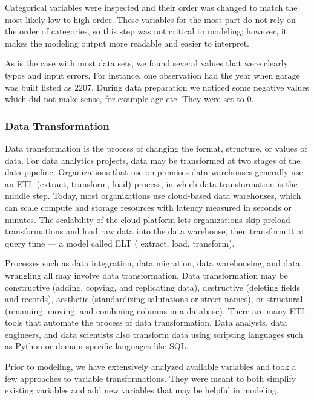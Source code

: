 \documentclass[
]{article}
\begin{document}
Categorical variables were inspected and their order was changed to
match the most likely low-to-high order. These variables for the most
part do not rely on the order of categories, so this step was not
critical to modeling; however, it makes the modeling output more
readable and easier to interpret.

As is the case with most data sets, we found several values that were
clearly typos and input errors. For instance, one observation had the
year when garage was built listed as 2207. During data preparation we
noticed some negative values which did not make sense, for example age
etc. They were set to 0.

\hypertarget{data-transformation}{%
\subsubsection{Data Transformation}\label{data-transformation}}

Data transformation is the process of changing the format, structure, or
values of data. For data analytics projects, data may be transformed at
two stages of the data pipeline. Organizations that use on-premises data
warehouses generally use an ETL (extract, transform, load) process, in
which data transformation is the middle step. Today, most organizations
use cloud-based data warehouses, which can scale compute and storage
resources with latency measured in seconds or minutes. The scalability
of the cloud platform lets organizations skip preload transformations
and load raw data into the data warehouse, then transform it at query
time --- a model called ELT ( extract, load, transform).

Processes such as data integration, data migration, data warehousing,
and data wrangling all may involve data transformation. Data
transformation may be constructive (adding, copying, and replicating
data), destructive (deleting fields and records), aesthetic
(standardizing salutations or street names), or structural (renaming,
moving, and combining columns in a database). There are many ETL tools
that automate the process of data transformation. Data analysts, data
engineers, and data scientists also transform data using scripting
languages such as Python or domain-specific languages like SQL.

Prior to modeling, we have extensively analyzed available variables and
took a few approaches to variable transformations. They were meant to
both simplify existing variables and add new variables that may be
helpful in modeling.
\end{document}
